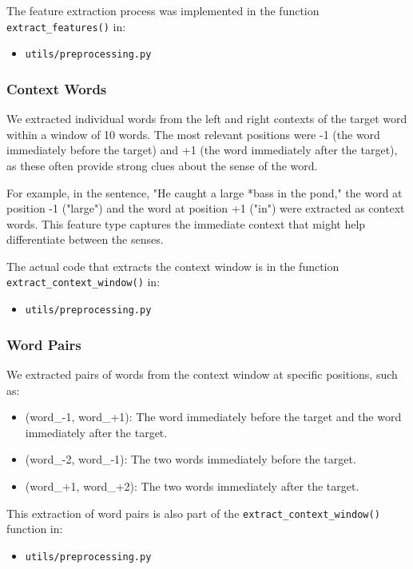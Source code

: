 \documentclass[journal,onecolumn]{IEEEtran}
\begin{document}
The feature extraction process was implemented in the function \texttt{extract\_features()} in:
\begin{itemize}
    \item \texttt{utils/preprocessing.py}
\end{itemize}

\subsubsection{Context Words}
We extracted individual words from the left and right contexts of the target word within a window of 10 words. The most relevant positions were -1 (the word immediately before the target) and +1 (the word immediately after the target), as these often provide strong clues about the sense of the word.

For example, in the sentence, "He caught a large *bass in the pond," the word at position -1 ("large") and the word at position +1 ("in") were extracted as context words. This feature type captures the immediate context that might help differentiate between the senses.

The actual code that extracts the context window is in the function \texttt{extract\_context\_window()} in:
\begin{itemize}
    \item \texttt{utils/preprocessing.py}
\end{itemize}

\subsubsection{Word Pairs}
We extracted pairs of words from the context window at specific positions, such as:
\begin{itemize}
    \item (word\_-1, word\_+1): The word immediately before the target and the word immediately after the target.
    \item (word\_-2, word\_-1): The two words immediately before the target.
    \item (word\_+1, word\_+2): The two words immediately after the target.
\end{itemize}

This extraction of word pairs is also part of the \texttt{extract\_context\_window()} function in:
\begin{itemize}
    \item \texttt{utils/preprocessing.py}
\end{itemize}
\end{document}
